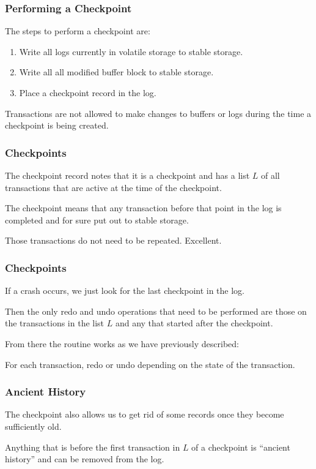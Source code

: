\begin{frame}
\frametitle{Performing a Checkpoint}

The steps to perform a checkpoint are:

\begin{enumerate}
	\item Write all logs currently in volatile storage to stable storage.
	\item Write all all modified buffer block to stable storage.
	\item Place a checkpoint record in the log.
\end{enumerate}

Transactions are not allowed to make changes to buffers or logs during the time a checkpoint is being created.

\end{frame}

\begin{frame}
\frametitle{Checkpoints}

The checkpoint record notes that it is a checkpoint and has a list $L$ of all transactions that are active at the time of the checkpoint. 

The checkpoint means that any transaction before that point in the log is completed and for sure put out to stable storage.

Those transactions do not need to be repeated. Excellent.

\end{frame}

\begin{frame}
\frametitle{Checkpoints}

If a crash occurs, we just look for the last checkpoint in the log. 

Then the only redo and undo operations that need to be performed are those on the transactions in the list $L$ and any that started after the checkpoint.

From there the routine works as we have previously described: 

For each transaction, redo or undo depending on the state of the transaction.
\end{frame}

\begin{frame}
\frametitle{Ancient History}

The checkpoint also allows us to get rid of some records once they become sufficiently old. 

Anything that is before the first transaction in $L$ of a checkpoint is ``ancient history'' and can be removed from the log.

\end{frame}

